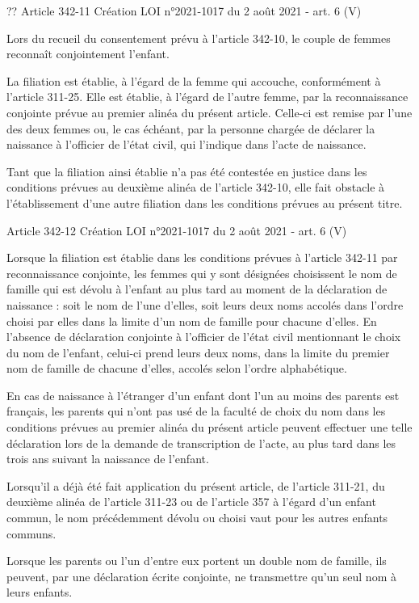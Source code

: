 \documentclass[
  12pt,
]{book}
\begin{document}
\begin{encadre}{??}
Article 342-11
Création LOI n°2021-1017 du 2 août 2021 - art. 6 (V)

Lors du recueil du consentement prévu à l'article 342-10, le couple de femmes reconnaît conjointement l'enfant.

La filiation est établie, à l'égard de la femme qui accouche, conformément à l'article 311-25. Elle est établie, à l'égard de l'autre femme, par la reconnaissance conjointe prévue au premier alinéa du présent article. Celle-ci est remise par l'une des deux femmes ou, le cas échéant, par la personne chargée de déclarer la naissance à l'officier de l'état civil, qui l'indique dans l'acte de naissance.

Tant que la filiation ainsi établie n'a pas été contestée en justice dans les conditions prévues au deuxième alinéa de l'article 342-10, elle fait obstacle à l'établissement d'une autre filiation dans les conditions prévues au présent titre.

Article 342-12
Création LOI n°2021-1017 du 2 août 2021 - art. 6 (V)

Lorsque la filiation est établie dans les conditions prévues à l'article 342-11 par reconnaissance conjointe, les femmes qui y sont désignées choisissent le nom de famille qui est dévolu à l'enfant au plus tard au moment de la déclaration de naissance : soit le nom de l'une d'elles, soit leurs deux noms accolés dans l'ordre choisi par elles dans la limite d'un nom de famille pour chacune d'elles. En l'absence de déclaration conjointe à l'officier de l'état civil mentionnant le choix du nom de l'enfant, celui-ci prend leurs deux noms, dans la limite du premier nom de famille de chacune d'elles, accolés selon l'ordre alphabétique.

En cas de naissance à l'étranger d'un enfant dont l'un au moins des parents est français, les parents qui n'ont pas usé de la faculté de choix du nom dans les conditions prévues au premier alinéa du présent article peuvent effectuer une telle déclaration lors de la demande de transcription de l'acte, au plus tard dans les trois ans suivant la naissance de l'enfant.

Lorsqu'il a déjà été fait application du présent article, de l'article 311-21, du deuxième alinéa de l'article 311-23 ou de l'article 357 à l'égard d'un enfant commun, le nom précédemment dévolu ou choisi vaut pour les autres enfants communs.

Lorsque les parents ou l'un d'entre eux portent un double nom de famille, ils peuvent, par une déclaration écrite conjointe, ne transmettre qu'un seul nom à leurs enfants.


\end{encadre}
\end{document}

